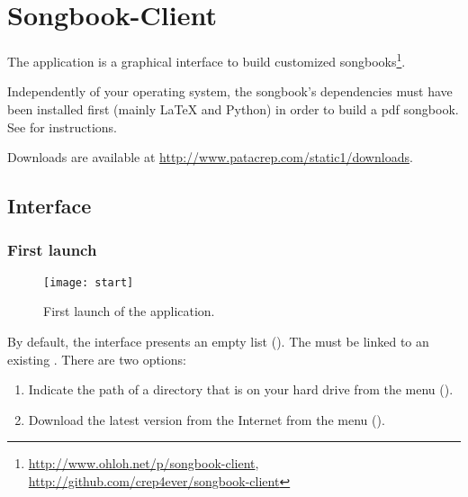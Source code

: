 \chapter{Songbook-Client}
\setcounter{chapter}{2}
\label{chap:songbook-client}
\minitoc

The \client{} application is a graphical interface to build customized
songbooks\footnote{\url{http://www.ohloh.net/p/songbook-client},
  \url{http://github.com/crep4ever/songbook-client}}.

\begin{nota}
Independently of your operating system, the songbook's dependencies must
have been installed first (mainly \LaTeX{} and Python) in order to
build a pdf songbook. See  for instructions.
\end{nota}

Downloads are available at \url{http://www.patacrep.com/static1/downloads}.


\section{Interface}

\subsection{First launch}

\begin{figure}
  \centering
  \texttt{[image: start]}
  \caption{First launch of the application.}
  \label{fig:start}
\end{figure}

By default, the interface presents an empty list
(). The \client{} must be linked to an existing
\recueil{}. There are two options:

\begin{enumerate}
\item Indicate the path of a  directory that is on
  your hard drive from the menu 
  ().
\item Download the latest version from the Internet from the menu
   ().
\end{enumerate}

